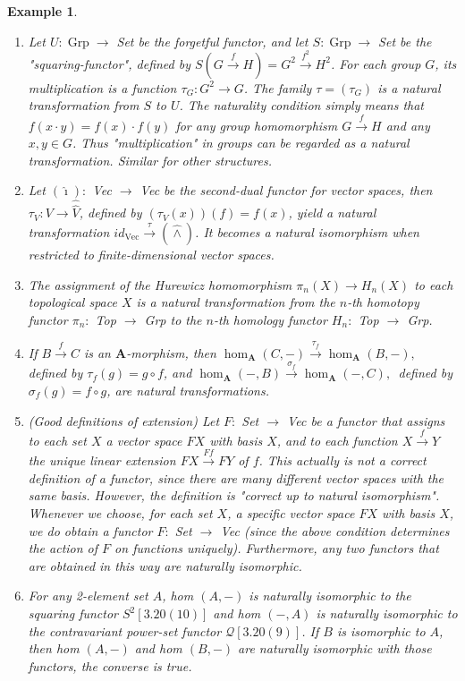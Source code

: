\documentclass{book}
\newtheorem{example}{Example}
\begin{document}
\begin{example}
    \begin{enumerate}
        \item Let $U: \operatorname{Grp} \rightarrow$ Set be the forgetful functor, and let $S: \operatorname{Grp} \rightarrow$ Set be the "squaring-functor", defined by $S(G \xrightarrow{f} H)=G^2 \xrightarrow{f^2} H^2$. For each group $G$, its multiplication is a function $\tau_G: G^2 \rightarrow G$. The family $\tau=\left(\tau_G\right)$ is a natural transformation from $S$ to $U$. The naturality condition simply means that $f(x \cdot y)=f(x) \cdot f(y)$ for any group homomorphism $G \xrightarrow{f} H$ and any $x, y \in G$. Thus "multiplication" in groups can be regarded as a natural transformation. Similar for other structures.
        \item Let $(\hat{\imath}):$ Vec $\rightarrow$ Vec be the second-dual functor for vector spaces, then $\tau_V: V \rightarrow \hat{\hat{V}}$, defined by $\left(\tau_V(x)\right)(f)=f(x)$, yield a natural transformation $i d{ }_{\mathrm{Vec}} \xrightarrow{\tau}(\hat{\wedge})$. It becomes a natural isomorphism when restricted to finite-dimensional vector spaces.
        \item The assignment of the Hurewicz homomorphism $\pi_n(X) \rightarrow H_n(X)$ to each topological space $X$ is a natural transformation from the $n$-th homotopy functor $\pi_n:$ Top $\rightarrow$ Grp to the $n$-th homology functor $H_n:$ Top $\rightarrow$ Grp.
        \item If $B \xrightarrow{f} C$ is an $\mathbf{A}$-morphism, then
        $
        \operatorname{hom}_{\mathbf{A}}(C,-) \xrightarrow{\tau_f} \operatorname{hom}_{\mathbf{A}}(B,-),
        $
        defined by $\tau_f(g)=g \circ f$, and
        $
        \operatorname{hom}_{\mathbf{A}}(-, B) \xrightarrow{\sigma_f} \operatorname{hom}_{\mathbf{A}}(-, C) \text {, }
        $
        defined by $\sigma_f(g)=f \circ g$, are natural transformations.
        \item (Good definitions of extension) Let $F:$ Set $\rightarrow$ Vec be a functor that assigns to each set $X$ a vector space $F X$ with basis $X$, and to each function $X \xrightarrow{f} Y$ the unique linear extension $F X \xrightarrow{F f} F Y$ of $f$. This actually is not a correct definition of a functor, since there are many different vector spaces with the same basis. However, the definition is "correct up to natural isomorphism". Whenever we choose, for each set $X$, a specific vector space $F X$ with basis $X$, we do obtain a functor $F:$ Set $\rightarrow$ Vec (since the above condition determines the action of $F$ on functions uniquely). Furthermore, any two functors that are obtained in this way are naturally isomorphic.
        \item For any 2-element set $A$, hom $(A,-)$ is naturally isomorphic to the squaring functor $S^2[3.20(10)]$ and hom $(-, A)$ is naturally isomorphic to the contravariant power-set functor $\mathcal{Q}[3.20(9)]$. If $B$ is isomorphic to $A$, then hom $(A,-)$ and hom $(B,-)$ are naturally isomorphic with those functors, the converse is true.
    \end{enumerate}
\end{example}
\end{document}
